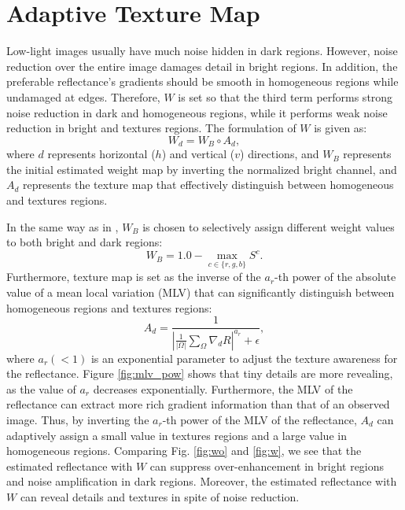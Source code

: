 \section{Adaptive Texture Map} \label{sec:adaptive}
Low-light images usually have much noise hidden in dark regions. 
However, noise reduction over the entire image damages detail in bright regions. 
In addition, the preferable reflectance's gradients should be smooth in homogeneous regions while undamaged at edges. 
Therefore, $W$ is set so that the third term performs strong noise reduction in dark and homogeneous regions, while it performs weak noise reduction in bright and textures regions. 
The formulation of $W$ is given as:
\begin{equation}
W_{d} = W_{B} \circ A_{d}, \label{eq: adaptive_texture}
\end{equation}
where $d$ represents horizontal ($h$) and vertical ($v$) directions, and $W_{B}$ represents the initial estimated weight map by inverting the normalized bright channel, and $A_{d}$ represents the texture map that effectively distinguish between homogeneous and textures regions.\par 
In the same way as in \cite{activation}, $W_{B}$ is chosen to selectively assign different weight values to both bright and dark regions:
\begin{equation}
W_{B} = 1.0 - \max_{c \in \{r, g, b\}}S^{c}. \label{eq: initial_weight}
\end{equation}
Furthermore, texture map is set as the inverse of the $a_{r}$-th power of the absolute value of a mean local variation (MLV) \cite{jiep} that can significantly distinguish between homogeneous regions and textures regions:
\begin{equation}
A_{d} = \frac{1}{\left |\frac{1}{|\Omega|}\sum_{\Omega}\nabla_{d}{R} \right|^{a_{r}} + \epsilon}, \label{eq: mlv}
\end{equation}
where $a_{r} (< 1)$ is an exponential parameter to adjust the texture awareness for the reflectance. 
Figure \ref{fig:mlv_pow} shows that tiny details are more revealing, as the value of $a_{r}$ decreases exponentially. Furthermore, the MLV of the reflectance can extract more rich gradient information than that of an observed image. Thus, by inverting the $a_{r}$-th power of the MLV of the reflectance, $A_{d}$ can adaptively assign a small value in textures regions and a large value in homogeneous regions. 
Comparing Fig. \ref{fig:wo} and \ref{fig:w}, we see that the estimated reflectance with $W$ can suppress over-enhancement in bright regions and noise amplification in dark regions. Moreover, the estimated reflectance with $W$ can reveal details and textures in spite of noise reduction. 
